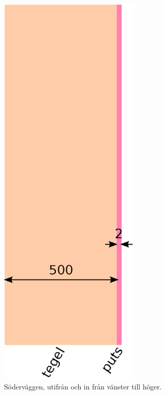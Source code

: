 \begin{figure}[hpbt]
\centering
\includegraphics[width=0.6\textwidth]{../images/sodervagg.eps}
\caption{\label{fig:sodervagg}{Söderväggen, utifrån och in från vänster till höger.}}
\end{figure}

